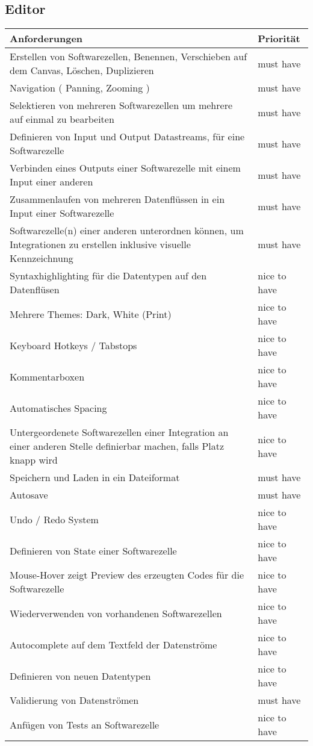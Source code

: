 \documentclass[11pt]{article}
\begin{document}
\subsection{Editor}
\label{sec:orgheadline11}
\begin{center}
\begin{tabular}{ll}
Anforderungen & Priorität\\
\hline
Erstellen von Softwarezellen, Benennen, Verschieben auf dem Canvas, Löschen, Duplizieren & must have\\
Navigation ( Panning, Zooming ) & must have\\
Selektieren von mehreren Softwarezellen um mehrere auf einmal zu bearbeiten & must have\\
Definieren von Input und Output Datastreams, für eine Softwarezelle & must have\\
Verbinden eines Outputs einer Softwarezelle mit einem Input einer anderen & must have\\
Zusammenlaufen von mehreren Datenflüssen in ein Input einer Softwarezelle & must have\\
Softwarezelle(n) einer anderen unterordnen können, um Integrationen zu erstellen inklusive visuelle Kennzeichnung & must have\\
Syntaxhighlighting für die Datentypen auf den Datenflüsen & nice to have\\
Mehrere Themes: Dark, White (Print) & nice to have\\
Keyboard Hotkeys / Tabstops & nice to have\\
Kommentarboxen & nice to have\\
Automatisches Spacing & nice to have\\
Untergeordenete Softwarezellen einer Integration an einer anderen Stelle definierbar machen, falls Platz knapp wird & nice to have\\
Speichern und Laden in ein Dateiformat & must have\\
Autosave & must have\\
Undo / Redo System & nice to have\\
Definieren von State einer Softwarezelle & nice to have\\
Mouse-Hover zeigt Preview des erzeugten Codes für die Softwarezelle & nice to have\\
Wiederverwenden von vorhandenen Softwarezellen & nice to have\\
Autocomplete auf dem Textfeld der Datenströme & nice to have\\
Definieren von neuen Datentypen & nice to have\\
Validierung von Datenströmen & must have\\
Anfügen von Tests an Softwarezelle & nice to have\\
\end{tabular}
\end{center}
\end{document}
